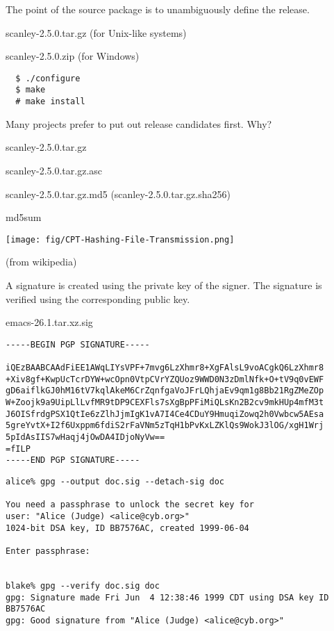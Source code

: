 \documentclass[landscape,30pt]{foils}
\begin{document}
The point of the source package is to unambiguously define the release.

scanley-2.5.0.tar.gz (for Unix-like systems)

scanley-2.5.0.zip (for Windows)

\newpage
\begin{verbatim}
  $ ./configure
  $ make
  # make install
\end{verbatim}


Many projects prefer to put out release candidates first.  Why?


scanley-2.5.0.tar.gz

scanley-2.5.0.tar.gz.asc

scanley-2.5.0.tar.gz.md5 (scanley-2.5.0.tar.gz.sha256)

md5sum

\begin{center}
\texttt{[image: fig/CPT-Hashing-File-Transmission.png]}
\end{center}

(from wikipedia)


A signature is created using the private key of the signer. The signature is verified using the corresponding public key.

emacs-26.1.tar.xz.sig

{\tiny
\begin{verbatim}
-----BEGIN PGP SIGNATURE-----

iQEzBAABCAAdFiEE1AWqLIYsVPF+7mvg6LzXhmr8+XgFAlsL9voACgkQ6LzXhmr8
+Xiv8gf+KwpUcTcrDYW+wcOpn0VtpCVrYZQUoz9WWD0N3zDmlNfk+O+tV9q0vEWF
gD6aiflkGJ0hM16tV7kqlAkeM6CrZqnfgaVoJFrLQhjaEv9qm1g8Bb21RgZMeZOp
W+Zoojk9a9UipLlLvfMR9tDP9CEXFls7sXgBpPFiMiQLsKn2B2cv9mkHUp4mfM3t
J6OISfrdgPSX1QtIe6zZlhJjmIgK1vA7I4Ce4CDuY9HmuqiZowq2h0Vwbcw5AEsa
5greYvtX+I2f6Uxppm6fdiS2rFaVNm5zTqH1bPvKxLZKlQs9WokJ3lOG/xgH1Wrj
5pIdAsIIS7wHaqj4jOwDA4IDjoNyVw==
=fILP
-----END PGP SIGNATURE-----
\end{verbatim}
}

{\tiny
\begin{verbatim}
alice% gpg --output doc.sig --detach-sig doc

You need a passphrase to unlock the secret key for
user: "Alice (Judge) <alice@cyb.org>"
1024-bit DSA key, ID BB7576AC, created 1999-06-04

Enter passphrase: 


blake% gpg --verify doc.sig doc
gpg: Signature made Fri Jun  4 12:38:46 1999 CDT using DSA key ID BB7576AC
gpg: Good signature from "Alice (Judge) <alice@cyb.org>"

\end{verbatim}
}
\end{document}
